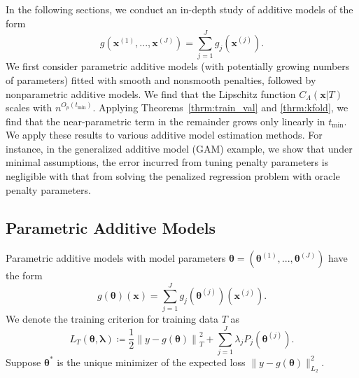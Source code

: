 \documentclass[12pt]{article} %
\theoremstyle{definition}
\begin{document}
In the following sections, we conduct an in-depth study of additive models of the form
\begin{equation}
g(\boldsymbol{x}^{(1)}, ..., \boldsymbol{x}^{(J)})= \sum_{j=1}^J g_j(\boldsymbol{x}^{(j)}).
\end{equation}
We first consider parametric additive models (with potentially growing numbers of parameters) fitted with smooth and nonsmooth penalties, followed by nonparametric additive models.
We find that the Lipschitz function $C_\Lambda(\boldsymbol{x} | T)$ scales with $n^{O_p(t_{\min})}$.
Applying Theorems~\ref{thrm:train_val} and \ref{thrm:kfold}, we find that the near-parametric term in the remainder grows only linearly in $t_{\min}$.
We apply these results to various additive model estimation methods.
For instance, in the generalized additive model (GAM) example, we show that under minimal assumptions, the error incurred from tuning penalty parameters is negligible with that from solving the penalized regression problem with oracle penalty parameters.

\subsection{Parametric Additive Models}
\label{sec:param_add_models}
Parametric additive models with model parameters $\boldsymbol{\theta} = \left (\boldsymbol{\theta}^{(1)}, ..., \boldsymbol{\theta}^{(J)} \right )$ have the form
\begin{equation}
g(\boldsymbol{\theta})(\boldsymbol{x})
= \sum_{j=1}^J g_j(\boldsymbol{\theta}^{(j)})(\boldsymbol{x}^{(j)}).
\end{equation}
We denote the training criterion for training data $T$ as
\begin{equation}
\label{eq:param_add}
L_T \left (\boldsymbol{\theta}, \boldsymbol{\lambda} \right)
\coloneqq \frac{1}{2} \left  \| y -  g(\boldsymbol{\theta}) \right \|^2_T
+ \sum_{j=1}^J \lambda_j P_j(\boldsymbol{\theta}^{(j)}).
\end{equation}
Suppose $\boldsymbol{\theta}^*$ is the unique minimizer of the expected loss $\| y - g(\boldsymbol{\theta}) \|^2_{L_2}$.
\end{document}
